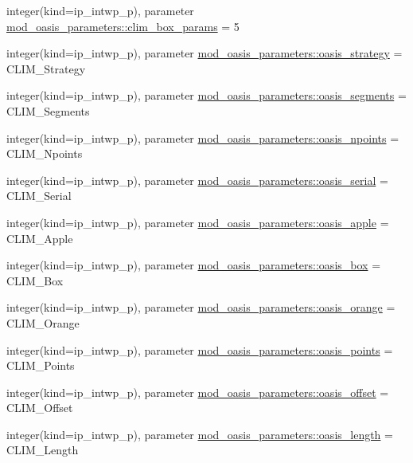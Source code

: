 \begin{DoxyCompactItemize}
\item 
integer(kind=ip\+\_\+intwp\+\_\+p), parameter \hyperlink{namespacemod__oasis__parameters_ad1b7c8ebf0654b72d75292821cf54bc9}{mod\+\_\+oasis\+\_\+parameters\+::clim\+\_\+box\+\_\+params} = 5
\item 
integer(kind=ip\+\_\+intwp\+\_\+p), parameter \hyperlink{namespacemod__oasis__parameters_aa6a71a0b20dacca6f3263d8619eb9fca}{mod\+\_\+oasis\+\_\+parameters\+::oasis\+\_\+strategy} = C\+L\+I\+M\+\_\+\+Strategy
\item 
integer(kind=ip\+\_\+intwp\+\_\+p), parameter \hyperlink{namespacemod__oasis__parameters_abea28ab92f0119c9beadce9c1461b88b}{mod\+\_\+oasis\+\_\+parameters\+::oasis\+\_\+segments} = C\+L\+I\+M\+\_\+\+Segments
\item 
integer(kind=ip\+\_\+intwp\+\_\+p), parameter \hyperlink{namespacemod__oasis__parameters_ac8f73bfed8f7b03f17cd72e7b95b4646}{mod\+\_\+oasis\+\_\+parameters\+::oasis\+\_\+npoints} = C\+L\+I\+M\+\_\+\+Npoints
\item 
integer(kind=ip\+\_\+intwp\+\_\+p), parameter \hyperlink{namespacemod__oasis__parameters_a6d75932f0d32fb81f74a14ff2236552a}{mod\+\_\+oasis\+\_\+parameters\+::oasis\+\_\+serial} = C\+L\+I\+M\+\_\+\+Serial
\item 
integer(kind=ip\+\_\+intwp\+\_\+p), parameter \hyperlink{namespacemod__oasis__parameters_a3ea72dd64e62c99227513c14b909b11c}{mod\+\_\+oasis\+\_\+parameters\+::oasis\+\_\+apple} = C\+L\+I\+M\+\_\+\+Apple
\item 
integer(kind=ip\+\_\+intwp\+\_\+p), parameter \hyperlink{namespacemod__oasis__parameters_aaec8bc9377ee93b6ff19e68dd1c629c1}{mod\+\_\+oasis\+\_\+parameters\+::oasis\+\_\+box} = C\+L\+I\+M\+\_\+\+Box
\item 
integer(kind=ip\+\_\+intwp\+\_\+p), parameter \hyperlink{namespacemod__oasis__parameters_abb1fb57f8d75a98957e6d3e1c85d0096}{mod\+\_\+oasis\+\_\+parameters\+::oasis\+\_\+orange} = C\+L\+I\+M\+\_\+\+Orange
\item 
integer(kind=ip\+\_\+intwp\+\_\+p), parameter \hyperlink{namespacemod__oasis__parameters_ac3b3c12b4455e1baab14dd39820586e8}{mod\+\_\+oasis\+\_\+parameters\+::oasis\+\_\+points} = C\+L\+I\+M\+\_\+\+Points
\item 
integer(kind=ip\+\_\+intwp\+\_\+p), parameter \hyperlink{namespacemod__oasis__parameters_a854ff4345b9a9676b39f7f30233a55d2}{mod\+\_\+oasis\+\_\+parameters\+::oasis\+\_\+offset} = C\+L\+I\+M\+\_\+\+Offset
\item 
integer(kind=ip\+\_\+intwp\+\_\+p), parameter \hyperlink{namespacemod__oasis__parameters_a631ca32860a10f8134985ad8db4667d2}{mod\+\_\+oasis\+\_\+parameters\+::oasis\+\_\+length} = C\+L\+I\+M\+\_\+\+Length

\end{DoxyCompactItemize}
